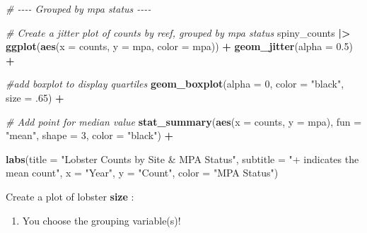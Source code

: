 \documentclass[
]{article}
\newenvironment{Shaded}{\begin{snugshade}}{\end{snugshade}}
\newcommand{\AttributeTok}[1]{\textcolor[rgb]{0.13,0.29,0.53}{#1}}
\newcommand{\CommentTok}[1]{\textcolor[rgb]{0.56,0.35,0.01}{\textit{#1}}}
\newcommand{\DecValTok}[1]{\textcolor[rgb]{0.00,0.00,0.81}{#1}}
\newcommand{\FloatTok}[1]{\textcolor[rgb]{0.00,0.00,0.81}{#1}}
\newcommand{\FunctionTok}[1]{\textcolor[rgb]{0.13,0.29,0.53}{\textbf{#1}}}
\newcommand{\NormalTok}[1]{#1}
\newcommand{\SpecialCharTok}[1]{\textcolor[rgb]{0.81,0.36,0.00}{\textbf{#1}}}
\newcommand{\StringTok}[1]{\textcolor[rgb]{0.31,0.60,0.02}{#1}}
\providecommand{\tightlist}{%
  \setlength{\itemsep}{0pt}\setlength{\parskip}{0pt}}
\begin{document}
\begin{Shaded}
\begin{Highlighting}[]
\CommentTok{\# {-}{-}{-}{-} Grouped by mpa status {-}{-}{-}{-}}

\CommentTok{\# Create a jitter plot of counts by reef, grouped by mpa status}
\NormalTok{spiny\_counts }\SpecialCharTok{|\textgreater{}}
\FunctionTok{ggplot}\NormalTok{(}\FunctionTok{aes}\NormalTok{(}\AttributeTok{x =}\NormalTok{ counts, }\AttributeTok{y =}\NormalTok{ mpa, }\AttributeTok{color =}\NormalTok{ mpa)) }\SpecialCharTok{+}
  \FunctionTok{geom\_jitter}\NormalTok{(}\AttributeTok{alpha =} \FloatTok{0.5}\NormalTok{) }\SpecialCharTok{+} 
    
    \CommentTok{\#add boxplot to display quartiles}
    \FunctionTok{geom\_boxplot}\NormalTok{(}\AttributeTok{alpha =} \DecValTok{0}\NormalTok{, }\AttributeTok{color =} \StringTok{"black"}\NormalTok{, }\AttributeTok{size =}\NormalTok{ .}\DecValTok{65}\NormalTok{) }\SpecialCharTok{+}
    
    \CommentTok{\# Add point for median value}
    \FunctionTok{stat\_summary}\NormalTok{(}\FunctionTok{aes}\NormalTok{(}\AttributeTok{x =}\NormalTok{ counts, }\AttributeTok{y =}\NormalTok{ mpa),}
                 \AttributeTok{fun =} \StringTok{"mean"}\NormalTok{,}
                 \AttributeTok{shape =} \DecValTok{3}\NormalTok{,}
                 \AttributeTok{color =} \StringTok{"black"}\NormalTok{) }\SpecialCharTok{+}
    
    \FunctionTok{labs}\NormalTok{(}\AttributeTok{title =} \StringTok{"Lobster Counts by Site \& MPA Status"}\NormalTok{,}
         \AttributeTok{subtitle =} \StringTok{"+ indicates the mean count"}\NormalTok{,}
         \AttributeTok{x =} \StringTok{"Year"}\NormalTok{,}
         \AttributeTok{y =} \StringTok{"Count"}\NormalTok{,}
         \AttributeTok{color =} \StringTok{"MPA Status"}\NormalTok{)}
\end{Highlighting}
\end{Shaded}

Create a plot of lobster \textbf{size} :

\begin{enumerate}
\def\labelenumi{\arabic{enumi})}
\setcounter{enumi}{3}
\tightlist
\item
  You choose the grouping variable(s)!
\end{enumerate}
\end{document}
